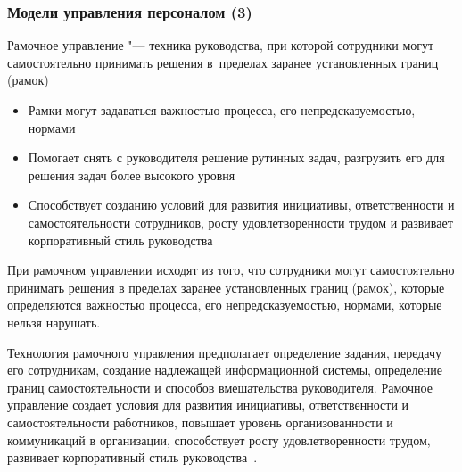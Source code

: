 \documentclass{../industrial-development}
\begin{document}
\begin{frame} \frametitle{Модели управления персоналом (3)}
	\alert{Рамочное управление} "--- техника руководства, при которой
	сотрудники могут самостоятельно принимать решения в~пределах заранее установленных границ (рамок)
	\begin{itemize}
		\item Рамки могут задаваться важностью процесса, его непредсказуемостью, нормами
		\item Помогает снять с руководителя решение рутинных задач, разгрузить его для решения задач более высокого уровня
		\item Способствует созданию условий для развития инициативы, ответственности и самостоятельности сотрудников, росту удовлетворенности трудом и развивает корпоративный стиль руководства 
	\end{itemize}
\end{frame}

\lecturenotes

При рамочном управлении исходят из того, что сотрудники могут самостоятельно принимать решения в пределах заранее установленных границ (рамок), которые определяются важностью процесса, его непредсказуемостью, нормами, которые нельзя нарушать.

Технология рамочного управления предполагает определение задания, передачу его сотрудникам, создание надлежащей информационной системы, определение границ самостоятельности и способов вмешательства руководителя. Рамочное управление создает условия для развития инициативы, ответственности и самостоятельности работников, повышает уровень организованности и коммуникаций в организации, способствует росту удовлетворенности трудом, развивает корпоративный стиль руководства~\cite{Porshnev}. 
\end{document}
